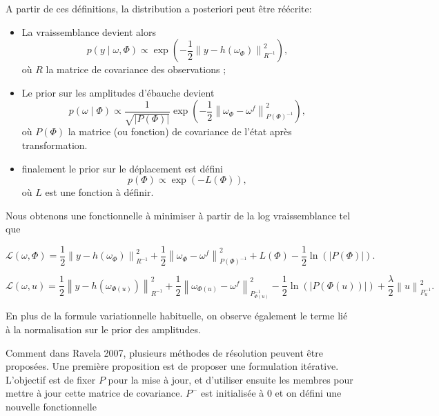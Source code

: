 \documentclass{article}
\newcommand{\norm}[1]{\left\lVert #1 \right\rVert}
\begin{document}
A partir de ces définitions, la distribution a posteriori peut être réécrite:

\begin{itemize}
    \item La vraissemblance devient alors
          \begin{equation*}
              p(y \mid \omega, \Phi) \propto \exp\left(-\frac{1}{2}\norm{y - h(\omega_\Phi)}^2_{R^{-1}}\right),
          \end{equation*}où $R$ la matrice de covariance des observations ;
    \item Le prior sur les amplitudes d'ébauche devient
          \begin{equation*}
              p(\omega \mid \Phi) \propto \frac{1}{\sqrt{|P(\Phi)|}} \exp\left(-\frac{1}{2} \norm{\omega_{\Phi} - \omega^f}^2_{P(\Phi)^{-1}}\right),
          \end{equation*}où $P(\Phi)$ la matrice (ou fonction) de covariance de l'état après transformation.
    \item finalement le prior sur le déplacement est défini
          \begin{equation*}
              p(\Phi) \propto \exp\left(-L(\Phi)\right),
          \end{equation*}où $L$ est une fonction à définir.
\end{itemize}

Nous obtenons une fonctionnelle à minimiser à partir de la log vraissemblance tel que

\begin{equation*}
    \mathcal L(\omega, \Phi) = \frac{1}{2}\norm{y - h(\omega_\Phi)}^2_{R^{-1}} + \frac{1}{2} \norm{\omega_{\Phi} - \omega^f}^2_{P(\Phi)^{-1}} + L(\Phi) - \frac{1}{2} \ln(|P(\Phi)|).
\end{equation*}

\begin{equation*}
    \mathcal L(\omega, u) = \frac{1}{2}\norm{y - h(\omega_{\Phi(u)})}^2_{R^{-1}} + \frac{1}{2} \norm{\omega_{\Phi(u)} - \omega^f}^2_{P_{\Phi(u)}^{-1}} - \frac{1}{2} \ln(|P(\Phi(u))|) + \frac\lambda 2 \norm{u}^2_{P_u^{-1}} .
\end{equation*}

En plus de la formule variationnelle habituelle, on observe également le terme lié à la normalisation sur le prior des amplitudes.

Comment dans Ravela 2007, plusieurs méthodes de résolution peuvent être proposées. Une première proposition est de proposer une formulation itérative. L'objectif est de fixer $P$ pour la mise à jour, et d'utiliser ensuite les membres pour mettre à jour cette matrice de covariance. $P^-$ est initialisée à 0 et on défini une nouvelle fonctionnelle
\end{document}

